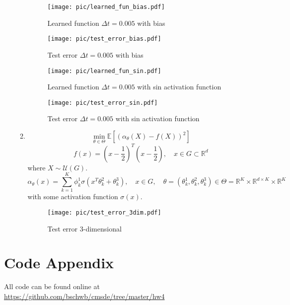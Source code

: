 \documentclass[a4paper,11pt]{scrartcl}
\newcommand*{\R}{\mathbb{R}}
\newcommand*{\EV}[1]{\mathbb{E}\left[{#1}\right]}
\newcommand*{\Dt}{\Delta{}t}
\begin{document}
\begin{enumerate}
\begin{enumerate}[leftmargin=1em]
    \begin{figure}[H]
        \begin{minipage}[t]{.5\linewidth}
          \centering
          \texttt{[image: pic/learned\_fun\_bias.pdf]}
          \caption{Learned function $\Dt=0.005$ with bias}
          \label{fig:learned_fun_bias}
        \end{minipage}%
        \begin{minipage}[t]{.5\linewidth}
          \centering
          \texttt{[image: pic/test\_error\_bias.pdf]}
          \caption{Test error $\Dt=0.005$ with bias}
          \label{fig:test_error_bias}
        \end{minipage}
    \end{figure}

    \begin{figure}[H]
        \begin{minipage}[b]{.5\linewidth}
          \centering
          \texttt{[image: pic/learned\_fun\_sin.pdf]}
          \caption{Learned function $\Dt=0.005$ with sin activation function}
          \label{fig:learned_fun_sin}
        \end{minipage}%
        \begin{minipage}[b]{.5\linewidth}
          \centering
          \texttt{[image: pic/test\_error\_sin.pdf]}
          \caption{Test error $\Dt=0.005$ with sin activation function}
          \label{fig:test_error_sin}
        \end{minipage}
    \end{figure}

    \item
     \[\min_{\theta\in\Theta} \EV{\left( \alpha_\theta(X) - f(X) \right)^2}\]
     \[f(x) = \left(x-\frac{1}{2}\right)^T\left(x-\frac{1}{2}\right), \quad
      x \in G \subset \R^d\]
      where $X \sim \mathcal{U}(G)$.
      \[\alpha_\theta(x) = \sum^K_{k=1}\phi_k^1\sigma\left( x^T \theta^2_k +
          \theta^3_k \right), \quad x \in G, \quad
        \theta = \left(\theta^1_k, \theta^2_k, \theta^3_k\right) \in \Theta = \R^K \times
        \R^{d\times K} \times \R^K\]
      with some activation function $\sigma(x)$.

    \begin{figure}[H]
      \centering
      \texttt{[image: pic/test\_error\_3dim.pdf]}
      \caption{Test error 3-dimensional}
      \label{fig:multidim}
    \end{figure}
\end{enumerate}

\end{enumerate}
 
\section*{Code Appendix}

All code can be found online at
\url{https://github.com/bschwb/cmsde/tree/master/hw4}




\end{document}
